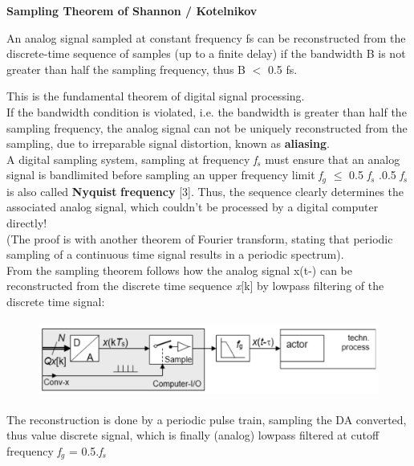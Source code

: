 {\rot\bf Sampling Theorem of Shannon / Kotelnikov}

\begin{tcolorbox}[colback=blue!5!white,colframe=blue!75!black]
An analog signal sampled at constant frequency fs can be reconstructed from the discrete-time sequence of samples (up to a finite delay) if the bandwidth B is not greater than half the sampling frequency, thus B $<$ 0.5 fs.
\end{tcolorbox}

This is the fundamental theorem of digital signal processing.\\

If the bandwidth condition is violated, i.e. the bandwidth is greater than half the sampling frequency, the analog signal can not be uniquely reconstructed from the sampling, due to irreparable signal distortion, known as \textbf{aliasing}.\\

A digital sampling system, sampling at frequency \textit{f${}_{s}$} must ensure that an analog signal is bandlimited before sampling an upper frequency limit \textit{f${}_{g}$} $\mathrm{\le}$ 0.5\textit{ f${}_{s}$} .0.5\textit{ f${}_{s}$} is also called \textbf{Nyquist} \textbf{frequency} [3]. Thus, the sequence clearly determines the associated analog signal, which couldn't be processed by a digital computer directly!\\

(The proof is with another theorem of Fourier transform, stating that periodic sampling of a continuous time signal results in a periodic spectrum).\\

From the sampling theorem follows how the analog signal x(t-) can be reconstructed from the discrete time sequence \textit{x}[k]  by lowpass filtering of the discrete time signal:\\

    \begin{figure}[h]
    \centering
    \includegraphics[width=14cm, height=2.5cm]{Images/image138.png}
    \label{fig:Fig }
    \end{figure}

The reconstruction is done by a periodic pulse train, sampling the DA converted, thus value discrete signal, which is finally (analog) lowpass filtered at cutoff frequency \textit{f}${}_{g}$ = 0.5$.$\textit{f}${}_{s}$\\ 

